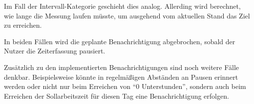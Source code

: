 Im Fall der Intervall-Kategorie geschieht dies analog.
Allerding wird berechnet, wie lange die Messung laufen müsste,
um ausgehend vom aktuellen Stand das Ziel zu erreichen.

In beiden Fällen wird die geplante Benachrichtigung abgebrochen,
sobald der Nutzer die Zeiterfassung pausiert.

Zusätzlich zu den implementierten Benachrichtigungen sind noch weitere Fälle denkbar.
Beispielsweise könnte in regelmäßigen Abständen an Pausen erinnert werden
oder nicht nur beim Erreichen von \enquote{0 Unterstunden},
sondern auch beim Erreichen der Sollarbeitszeit für diesen Tag eine Benachrichtigung erfolgen.